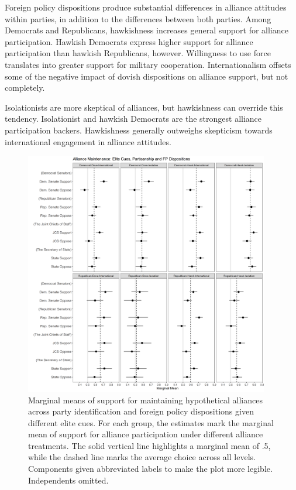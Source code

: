 \documentclass[12pt]{article}
\begin{document}
Foreign policy dispositions produce substantial differences in alliance attitudes within parties, in addition to the differences between both parties. 
Among Democrats and Republicans, hawkishness increases general support for alliance participation.
Hawkish Democrats express higher support for alliance participation than hawkish Republicans, however. 
Willingness to use force translates into greater support for military cooperation. 
Internationalism offsets some of the negative impact of dovish dispositions on alliance support, but not completely. 


Isolationists are more skeptical of alliances, but hawkishness can override this tendency. 
Isolationist and hawkish Democrats are the strongest alliance participation backers. 
Hawkishness generally outweighs skepticism towards international engagement in alliance attitudes. 


\begin{figure}
	\centering
		\includegraphics[width=0.95\textwidth]{../figures/party-dispo-main-el.png}
	\caption{Marginal means of support for maintaining hypothetical alliances across party identification and foreign policy dispositions given different elite cues. For each group, the estimates mark the marginal mean of support for alliance participation under different alliance treatments. The solid vertical line highlights a marginal mean of .5, while the dashed line marks the average choice across all levels. Components given abbreviated labels to make the plot more legible. Independents omitted.}
	\label{fig:party-dispo-main-el}
\end{figure}
\end{document}
